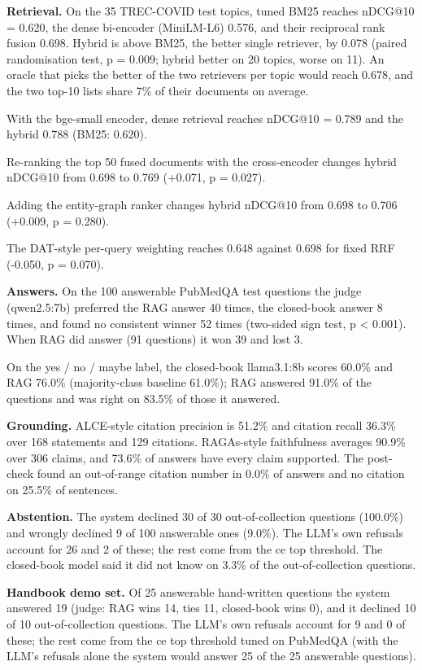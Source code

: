 \noindent\textbf{Retrieval.} On the 35 TREC-COVID test topics, tuned BM25 reaches nDCG@10 = 0.620, the dense bi-encoder (MiniLM-L6) 0.576, and their reciprocal rank fusion 0.698. Hybrid is above BM25, the better single retriever, by 0.078 (paired randomisation test, p = 0.009; hybrid better on 20 topics, worse on 11). An oracle that picks the better of the two retrievers per topic would reach 0.678, and the two top-10 lists share 7\% of their documents on average.

With the bge-small encoder, dense retrieval reaches nDCG@10 = 0.789 and the hybrid 0.788 (BM25: 0.620).

Re-ranking the top 50 fused documents with the cross-encoder changes hybrid nDCG@10 from 0.698 to 0.769 (+0.071, p = 0.027).

Adding the entity-graph ranker changes hybrid nDCG@10 from 0.698 to 0.706 (+0.009, p = 0.280).

The DAT-style per-query weighting reaches 0.648 against 0.698 for fixed RRF (-0.050, p = 0.070).

\noindent\textbf{Answers.} On the 100 answerable PubMedQA test questions the judge (qwen2.5:7b) preferred the RAG answer 40 times, the closed-book answer 8 times, and found no consistent winner 52 times (two-sided sign test, p < 0.001). When RAG did answer (91 questions) it won 39 and lost 3.

On the yes / no / maybe label, the closed-book llama3.1:8b scores 60.0\% and RAG 76.0\% (majority-class baseline 61.0\%); RAG answered 91.0\% of the questions and was right on 83.5\% of those it answered.

\noindent\textbf{Grounding.} ALCE-style citation precision is 51.2\% and citation recall 36.3\% over 168 statements and 129 citations. RAGAs-style faithfulness averages 90.9\% over 306 claims, and 73.6\% of answers have every claim supported. The post-check found an out-of-range citation number in 0.0\% of answers and no citation on 25.5\% of sentences.

\noindent\textbf{Abstention.} The system declined 30 of 30 out-of-collection questions (100.0\%) and wrongly declined 9 of 100 answerable ones (9.0\%). The LLM's own refusals account for 26 and 2 of these; the rest come from the ce top threshold. The closed-book model said it did not know on 3.3\% of the out-of-collection questions.

\noindent\textbf{Handbook demo set.} Of 25 answerable hand-written questions the system answered 19 (judge: RAG wins 14, ties 11, closed-book wins 0), and it declined 10 of 10 out-of-collection questions. The LLM's own refusals account for 9 and 0 of these; the rest come from the ce top threshold tuned on PubMedQA (with the LLM's refusals alone the system would answer 25 of the 25 answerable questions).
